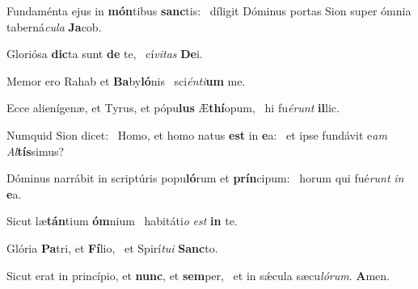 \item Fundaménta ejus in \textbf{món}tibus \textbf{sanc}tis:~\psstar{} díligit Dóminus portas Sion super ómnia taberná\textit{cula} \textbf{Ja}cob.
\item Gloriósa \textbf{dic}ta sunt \textbf{de} te,~\psstar{} cí\textit{vitas} \textbf{De}i.
\item Memor ero Rahab et \textbf{Ba}by\textbf{ló}nis~\psstar{} sci\textit{énti}\textbf{um} me.
\item Ecce alienígenæ, et Tyrus, et pópu\textbf{lus} Æ\textbf{thí}opum,~\psstar{} hi fu\textit{érunt} \textbf{il}lic.
\item Numquid Sion dicet:~\pscross{} Homo, et homo natus \textbf{est} in \textbf{e}a:~\psstar{} et ipse fundávit e\textit{am} \textit{Al}\textbf{tís}simus?
\item Dóminus narrábit in scriptúris popu\textbf{ló}rum et \textbf{prín}cipum:~\psstar{} horum qui fué\textit{runt} \textit{in} \textbf{e}a.
\item Sicut læ\textbf{tán}tium \textbf{óm}nium~\psstar{} habitáti\textit{o} \textit{est} \textbf{in} te.
\item Glória \textbf{Pa}tri, et \textbf{Fí}lio,~\psstar{} et Spirí\textit{tui} \textbf{Sanc}to.
\item Sicut erat in princípio, et \textbf{nunc}, et \textbf{sem}per,~\psstar{} et in sǽcula sæcu\textit{lórum}. \textbf{A}men.